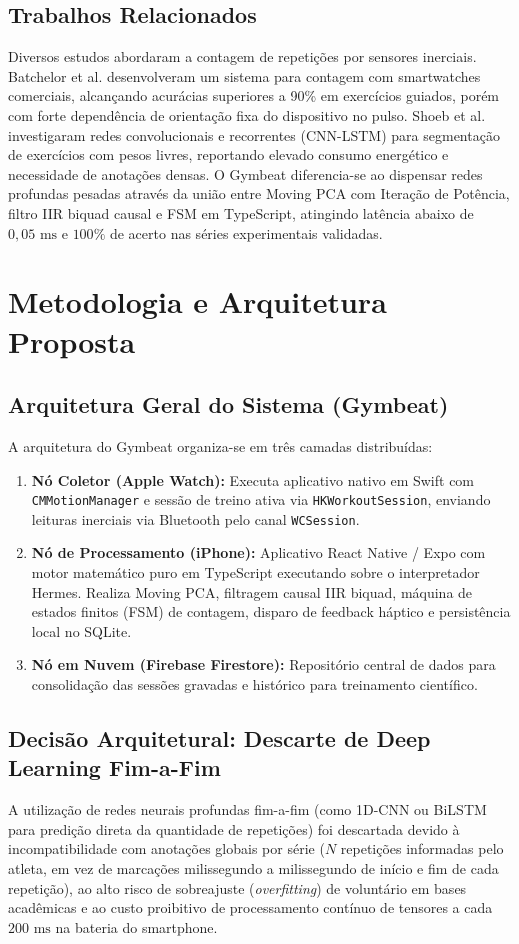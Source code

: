 \documentclass[12pt,openany,oneside,a4paper,english,brazil]{abntex2}
\begin{document}
\section{Trabalhos Relacionados}
Diversos estudos abordaram a contagem de repetições por sensores inerciais. Batchelor et al. \cite{batchelor2020} desenvolveram um sistema para contagem com smartwatches comerciais, alcançando acurácias superiores a 90\% em exercícios guiados, porém com forte dependência de orientação fixa do dispositivo no pulso. Shoeb et al. \cite{shoeb2021} investigaram redes convolucionais e recorrentes (CNN-LSTM) para segmentação de exercícios com pesos livres, reportando elevado consumo energético e necessidade de anotações densas. O Gymbeat diferencia-se ao dispensar redes profundas pesadas através da união entre Moving PCA com Iteração de Potência, filtro IIR biquad causal e FSM em TypeScript, atingindo latência abaixo de $0{,}05\text{ ms}$ e $100\%$ de acerto nas séries experimentais validadas.

\chapter{Metodologia e Arquitetura Proposta}

\section{Arquitetura Geral do Sistema (Gymbeat)}
A arquitetura do Gymbeat organiza-se em três camadas distribuídas:
\begin{enumerate}
    \item \textbf{Nó Coletor (Apple Watch):} Executa aplicativo nativo em Swift com \texttt{CMMotionManager} e sessão de treino ativa via \texttt{HKWorkoutSession}, enviando leituras inerciais via Bluetooth pelo canal \texttt{WCSession}.
    \item \textbf{Nó de Processamento (iPhone):} Aplicativo React Native / Expo com motor matemático puro em TypeScript executando sobre o interpretador Hermes. Realiza Moving PCA, filtragem causal IIR biquad, máquina de estados finitos (FSM) de contagem, disparo de feedback háptico e persistência local no SQLite.
    \item \textbf{Nó em Nuvem (Firebase Firestore):} Repositório central de dados para consolidação das sessões gravadas e histórico para treinamento científico.
\end{enumerate}

\section{Decisão Arquitetural: Descarte de Deep Learning Fim-a-Fim}
A utilização de redes neurais profundas fim-a-fim (como 1D-CNN ou BiLSTM para predição direta da quantidade de repetições) foi descartada devido à incompatibilidade com anotações globais por série ($N$ repetições informadas pelo atleta, em vez de marcações milissegundo a milissegundo de início e fim de cada repetição), ao alto risco de sobreajuste (\textit{overfitting}) de voluntário em bases acadêmicas e ao custo proibitivo de processamento contínuo de tensores a cada $200\text{ ms}$ na bateria do smartphone.
\end{document}
